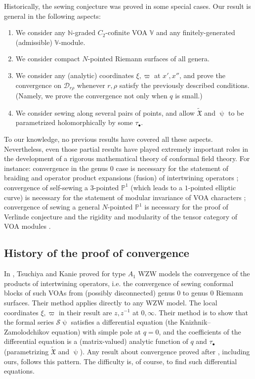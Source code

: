 \documentclass[12pt,a4paper,notitlepage]{article}
\theoremstyle{definition}
\theoremstyle{plain}
\newcommand{\fk}{\mathfrak}
\newcommand{\mc}{\mathcal}
\newcommand{\wtd}{\widetilde}
\newcommand{\blt}{\bullet}
\newcommand{\Vbb}{\mathbb V}
\newcommand{\Nbb}{\mathbb N}
\newcommand{\Pbb}{\mathbb P}
\numberwithin{equation}{section}
\begin{document}
Historically, the sewing conjecture was proved in some special cases. Our result is general in the following aspects:
\begin{enumerate}[label=(\alph*)]
\item We consider any $\Nbb$-graded $C_2$-cofinite VOA $\Vbb$ and any finitely-generated (admissible) $\Vbb$-module.
\item We consider  compact $N$-pointed Riemann surfaces of all genera.
\item We consider any (analytic) coordinates $\xi,\varpi$ at $x',x''$, and prove the convergence on $\mc D_{r\rho}$ whenever $r,\rho$ satisfy the previously described conditions. (Namely, we  prove the convergence not only when $q$ is small.)
\item We consider sewing along several pairs of points, and allow $\wtd{\fk X}$ and $\uppsi$ to be parametrized holomorphically by some $\tau_\blt$. 
\end{enumerate}
To our knowledge, no previous results have covered all these aspects. Nevertheless, even those partial results have played extremely important roles in the development of a rigorous mathematical theory of conformal field theory. For instance: convergence in the genus $0$ case is necessary for the statement of braiding and operator product expansions (fusion) of intertwining operators \cite{TK88,Hua05a}; convergence of self-sewing a $3$-pointed $\Pbb^1$ (which leads to a $1$-pointed elliptic curve) is necessary for the statement of modular invariance of VOA characters \cite{Zhu96}; convergence of sewing a general $N$-pointed $\Pbb^1$ is necessary for the proof of Verlinde conjecture and the rigidity and modularity of the tensor category of VOA modules \cite{Hua05b,Hua08a,Hua08b}.




\subsection*{History of the proof of convergence}

In \cite{TK88}, Tsuchiya and Kanie proved for type $A_1$ WZW models the convergence of the  products of intertwining operators, i.e. the convergence of sewing conformal blocks of such VOAs from (possibly disconnected) genus $0$ to genus $0$ Riemann surfaces. Their method applies directly to any WZW model. The local coordinates $\xi,\varpi$ in their result are $z,z^{-1}$ at $0,\infty$.  Their method is to show that the formal series $\mc S\uppsi$ satisfies a differential equation (the Knizhnik–Zamolodchikov equation) with simple pole at $q=0$, and the coefficients of the differential equation is a (matrix-valued) analytic function of $q$ and $\tau_\blt$ (parametrizing $\wtd{\fk X}$ and $\uppsi$). Any result about convergence proved after \cite{TK88}, including ours, follows this pattern. The difficulty is, of course,  to find such differential equations. 
\end{document}
